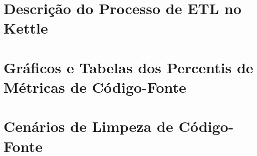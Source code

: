 \begin{apendicesenv}

\chapter{Descrição do Processo de ETL no Kettle}
\label{sec:implementação-etl}

\chapter{Gráficos e Tabelas dos Percentis de Métricas de Código-Fonte}

\chapter{Cenários de Limpeza de Código-Fonte}
\label{scenarios}


\end{apendicesenv}
